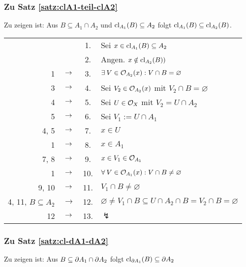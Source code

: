 \subsubsection{Zu Satz \ref{satz:clA1-teil-clA2}}\label{anh:clA1-teil-clA2}
    Zu zeigen ist: Aus ${B \subseteq A_1 \cap A_2}$ und ${\text{cl}_{A_1}(B) \subseteq A_2}$ folgt ${\text{cl}_{A_1}(B) \subseteq \text{cl}_{A_2}(B)}$.
    \begin{longtable}{r c c l}
        & & 1. & Sei $x \in \text{cl}_{A_1}(B) \subseteq A_2$ \\
        & & 2. & Angen. $x \notin \text{cl}_{A_2}(B))$ \\
        1 & $\rightarrow$ & 3. & $\exists\: V \in \mathcal{O}_{A_2}(x) : V \cap B = \varnothing$\\
        3 & $\rightarrow$ & 4. & Sei $V_2 \in \mathcal{O}_{A_2}(x)$ mit $V_2 \cap B = \varnothing$ \\
        4 & $\rightarrow$ & 5. & Sei $U \in \mathcal{O}_X$ mit $V_2 = U \cap A_2$ \\
        5 & $\rightarrow$ & 6. & Sei $V_1 := U \cap A_1$ \\
        4, 5 & $\rightarrow$ & 7. & $x \in U$ \\
        1 & $\rightarrow$ & 8. & $x \in A_1$ \\
        7, 8 & $\rightarrow$ & 9. & $x \in V_1 \in \mathcal{O}_{A_1}$ \\
        1 & $\rightarrow$ & 10. & $\forall\: V \in \mathcal{O}_{A_1}(x): V \cap B \neq \varnothing$ \\
        9, 10 & $\rightarrow$ & 11. & $V_1 \cap B \neq \varnothing$ \\
        4, 11, $B \subseteq A_2$ & $\to$ & 12. & $\varnothing \neq V_1 \cap B \subseteq U \cap A_2 \cap B = V_2 \cap B = \varnothing$ \\
        12 & $\rightarrow$ & 13. & $\lightning$
    \end{longtable}


\subsubsection{Zu Satz \ref{satz:cl-dA1-dA2}}\label{anh:cl-dA1-dA2}
    Zu zeigen ist: Aus $B \subseteq \partial A_1 \cap \partial A_2$ folgt $\text{cl}_{\partial A_1}(B) \subseteq \partial A_2$

